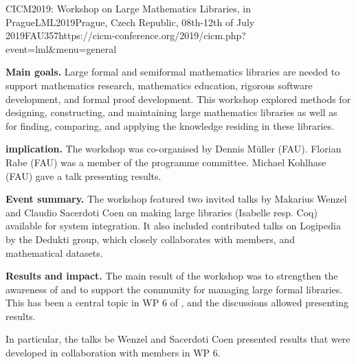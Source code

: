 \begin{event}{CICM2019: Workshop on Large Mathematics Libraries, in Prague}{LML2019}{Prague, Czech Republic, 08th-12th of July 2019}{FAU}{35}{7}{https://cicm-conference.org/2019/cicm.php?event=lml&menu=general}

\textbf{Main goals.}
Large formal and semiformal mathematics libraries are needed to support mathematics research, mathematics education, rigorous software development, and formal proof development.
This workshop explored methods for designing, constructing, and maintaining large mathematics libraries as well as for finding, comparing, and applying the knowledge residing in these libraries. 

\textbf{\ODK implication.}
The workshop was co-organised by Dennis M\"uller (FAU).
Florian Rabe (FAU) was a member of the programme committee.
Michael Kohlhase (FAU) gave a talk presenting \ODK results.

\textbf{Event summary.}
The workshop featured two invited talks by Makarius Wenzel and Claudio Sacerdoti Coen on making large libraries (Isabelle resp. Coq) available for system integration.
It also included contributed talks on Logipedia by the Dedukti group, which closely collaborates with \ODK members, and mathematical datasets.

\textbf{Results and impact.}
The main result of the workshop was to strengthen the awareness of and to support the community for managing large formal libraries.
This has been a central topic in WP 6 of \ODK, and the discussions allowed presenting \ODK results.

In particular, the talks be Wenzel and Sacerdoti Coen presented results that were developed in collaboration with \ODK members in WP 6.
\end{event}
